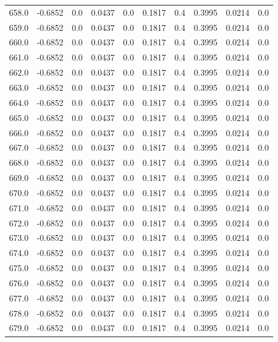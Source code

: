 \begin{longtable}{lrrrrrrrrr}
658.0 & -0.6852 & 0.0 & 0.0437 & 0.0 & 0.1817 & 0.4 & 0.3995 & 0.0214 & 0.0 \\
659.0 & -0.6852 & 0.0 & 0.0437 & 0.0 & 0.1817 & 0.4 & 0.3995 & 0.0214 & 0.0 \\
660.0 & -0.6852 & 0.0 & 0.0437 & 0.0 & 0.1817 & 0.4 & 0.3995 & 0.0214 & 0.0 \\
661.0 & -0.6852 & 0.0 & 0.0437 & 0.0 & 0.1817 & 0.4 & 0.3995 & 0.0214 & 0.0 \\
662.0 & -0.6852 & 0.0 & 0.0437 & 0.0 & 0.1817 & 0.4 & 0.3995 & 0.0214 & 0.0 \\
663.0 & -0.6852 & 0.0 & 0.0437 & 0.0 & 0.1817 & 0.4 & 0.3995 & 0.0214 & 0.0 \\
664.0 & -0.6852 & 0.0 & 0.0437 & 0.0 & 0.1817 & 0.4 & 0.3995 & 0.0214 & 0.0 \\
665.0 & -0.6852 & 0.0 & 0.0437 & 0.0 & 0.1817 & 0.4 & 0.3995 & 0.0214 & 0.0 \\
666.0 & -0.6852 & 0.0 & 0.0437 & 0.0 & 0.1817 & 0.4 & 0.3995 & 0.0214 & 0.0 \\
667.0 & -0.6852 & 0.0 & 0.0437 & 0.0 & 0.1817 & 0.4 & 0.3995 & 0.0214 & 0.0 \\
668.0 & -0.6852 & 0.0 & 0.0437 & 0.0 & 0.1817 & 0.4 & 0.3995 & 0.0214 & 0.0 \\
669.0 & -0.6852 & 0.0 & 0.0437 & 0.0 & 0.1817 & 0.4 & 0.3995 & 0.0214 & 0.0 \\
670.0 & -0.6852 & 0.0 & 0.0437 & 0.0 & 0.1817 & 0.4 & 0.3995 & 0.0214 & 0.0 \\
671.0 & -0.6852 & 0.0 & 0.0437 & 0.0 & 0.1817 & 0.4 & 0.3995 & 0.0214 & 0.0 \\
672.0 & -0.6852 & 0.0 & 0.0437 & 0.0 & 0.1817 & 0.4 & 0.3995 & 0.0214 & 0.0 \\
673.0 & -0.6852 & 0.0 & 0.0437 & 0.0 & 0.1817 & 0.4 & 0.3995 & 0.0214 & 0.0 \\
674.0 & -0.6852 & 0.0 & 0.0437 & 0.0 & 0.1817 & 0.4 & 0.3995 & 0.0214 & 0.0 \\
675.0 & -0.6852 & 0.0 & 0.0437 & 0.0 & 0.1817 & 0.4 & 0.3995 & 0.0214 & 0.0 \\
676.0 & -0.6852 & 0.0 & 0.0437 & 0.0 & 0.1817 & 0.4 & 0.3995 & 0.0214 & 0.0 \\
677.0 & -0.6852 & 0.0 & 0.0437 & 0.0 & 0.1817 & 0.4 & 0.3995 & 0.0214 & 0.0 \\
678.0 & -0.6852 & 0.0 & 0.0437 & 0.0 & 0.1817 & 0.4 & 0.3995 & 0.0214 & 0.0 \\
679.0 & -0.6852 & 0.0 & 0.0437 & 0.0 & 0.1817 & 0.4 & 0.3995 & 0.0214 & 0.0 \\

\end{longtable}
